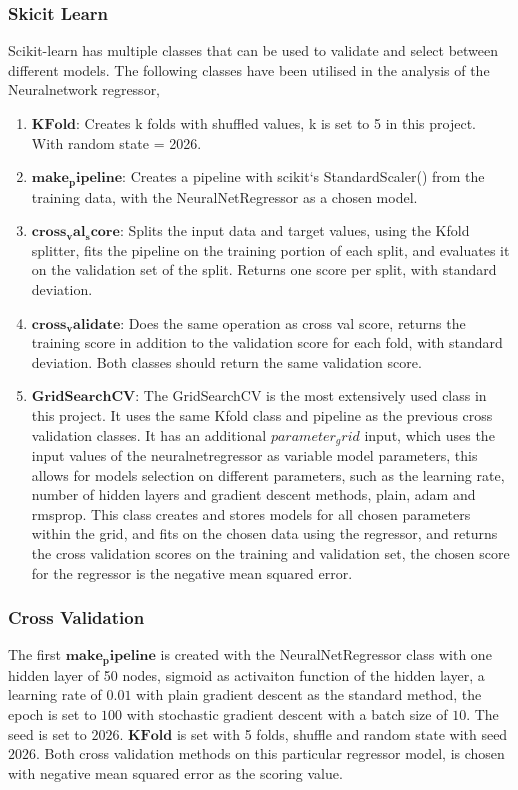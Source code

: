 \subsubsection{Skicit Learn}
Scikit-learn has multiple classes that can be used to validate and
select between different models. The following classes have been utilised
in the analysis of the Neuralnetwork regressor, 
\begin{enumerate}
    \item $\mathbf{KFold}$: Creates k folds with shuffled values, k is set to 5 in this project. With random state = 2026.
    \item $\mathbf{make_pipeline}$: Creates a pipeline with scikit`s StandardScaler() from the training data, with the NeuralNetRegressor as a chosen model.
    \item $\mathbf{cross_val_score}$: Splits the input data and target values, using the Kfold splitter, fits the pipeline on the training portion of each split, and evaluates it on the validation set of the split. Returns one score per split, with standard deviation.
    \item $\mathbf{cross_validate}$: Does the same operation as cross val score, returns the training score in addition to the validation score for each fold, with standard deviation. Both classes should return the same validation score.
    \item $\mathbf{GridSearchCV}$: The GridSearchCV is the most extensively used class in this project. It uses the same Kfold class and pipeline as the previous cross validation classes. 
    It has an additional $parameter_grid$ input, which uses the input values of the neuralnetregressor as variable model parameters, this allows for models selection on different parameters, such as 
    the learning rate, number of hidden layers and gradient descent methods, plain, adam and rmsprop. This class creates and stores models for all chosen parameters within the grid, and fits on the chosen data using the regressor, and returns the cross validation scores on the training and validation set, the chosen score for the regressor is the negative mean squared error.
\end{enumerate}
\subsubsection{Cross Validation}
The first $\mathbf{make_pipeline}$ is created with the NeuralNetRegressor class with
one hidden layer of 50 nodes, sigmoid as activaiton function of the hidden layer,
a learning rate of $0.01$ with plain gradient descent as the standard method, 
the epoch is set to $100$ with stochastic gradient descent with a batch size of $10$. 
The seed is set to $2026$. 
$\mathbf{KFold}$ is set with 5 folds, shuffle and random state with seed $2026$.
Both cross validation methods on this particular regressor model, is chosen with negative mean squared error
as the scoring value. 
